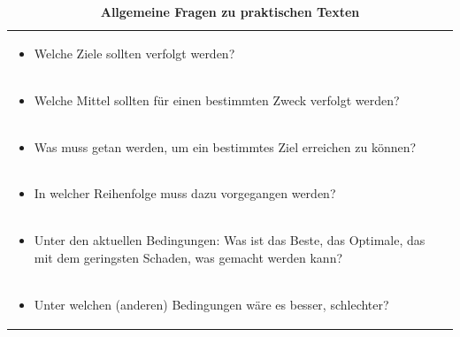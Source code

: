\documentclass[]{book}
\providecommand{\tightlist}{%
  \setlength{\itemsep}{0pt}\setlength{\parskip}{0pt}}
\theoremstyle{definition}
\theoremstyle{definition}
\theoremstyle{definition}
\theoremstyle{remark}
\begin{document}
\begin{longtable}[]{@{}l@{}}
\caption{\textbf{\label{tab:praktische-texte} Allgemeine Fragen zu
praktischen Texten}}\tabularnewline
\toprule
\begin{minipage}[t]{0.97\columnwidth}\raggedright\strut
\begin{itemize}
\tightlist
\item
  Welche Ziele sollten verfolgt werden? \vspace{-6mm}
\end{itemize}\strut
\end{minipage}\tabularnewline
\begin{minipage}[t]{0.97\columnwidth}\raggedright\strut
\begin{itemize}
\tightlist
\item
  Welche Mittel sollten für einen bestimmten Zweck verfolgt werden?
  \vspace{-6mm}
\end{itemize}\strut
\end{minipage}\tabularnewline
\begin{minipage}[t]{0.97\columnwidth}\raggedright\strut
\begin{itemize}
\tightlist
\item
  Was muss getan werden, um ein bestimmtes Ziel erreichen zu können?
  \vspace{-6mm}
\end{itemize}\strut
\end{minipage}\tabularnewline
\begin{minipage}[t]{0.97\columnwidth}\raggedright\strut
\begin{itemize}
\tightlist
\item
  In welcher Reihenfolge muss dazu vorgegangen werden? \vspace{-6mm}
\end{itemize}\strut
\end{minipage}\tabularnewline
\begin{minipage}[t]{0.97\columnwidth}\raggedright\strut
\begin{itemize}
\tightlist
\item
  Unter den aktuellen Bedingungen: Was ist das Beste, das Optimale, das
  mit dem geringsten Schaden, was gemacht werden kann? \vspace{-6mm}
\end{itemize}\strut
\end{minipage}\tabularnewline
\begin{minipage}[t]{0.97\columnwidth}\raggedright\strut
\begin{itemize}
\tightlist
\item
  Unter welchen (anderen) Bedingungen wäre es besser, schlechter?
\end{itemize}\strut
\end{minipage}\tabularnewline
\bottomrule
\end{longtable}
\end{document}
